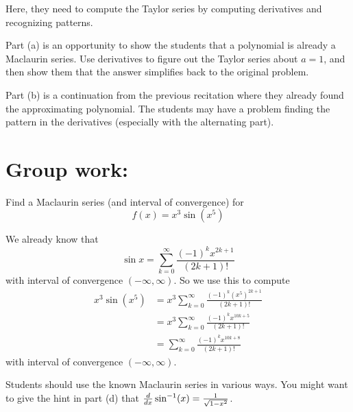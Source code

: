 \documentclass[handout]{ximera}
\begin{document}
\begin{instructorNotes}
Here, they need to compute the Taylor series by computing derivatives and recognizing patterns.  

Part (a) is an opportunity to show the students that a polynomial is already a Maclaurin series.  
Use derivatives to figure out the Taylor series about $a=1$, and then show them that the answer simplifies back to the original problem.  

Part (b) is a continuation from the previous recitation where they already found the approximating polynomial.  
The students may have a problem finding the pattern in the derivatives (especially with the alternating part).
\end{instructorNotes}







\section{Group work:}




\begin{problem}
Find a Maclaurin series (and interval of convergence) for
\[
f(x) = x^3 \sin(x^5)
\]
	
	\begin{freeResponse}
	
  We already know that 
		\[
		\sin x = \sum_{k=0}^\infty \frac{(-1)^k x^{2k+1}}{(2k+1)!}
		\]
	with interval of convergence $( - \infty, \infty)$.  
	So we use this to compute
		\begin{align*}
		x^3 \sin(x^5) &= x^3 \sum_{k=0}^\infty \frac{(-1)^k (x^5)^{2k+1}}{(2k+1)!}  \\
		&= x^3 \sum_{k=0}^\infty \frac{(-1)^k x^{10k+5}}{(2k+1)!}  \\
		&= \boxed{\sum_{k=0}^\infty \frac{(-1)^k x^{10k+8}}{(2k+1)!}}
		\end{align*}
	with interval of convergence $( - \infty, \infty)$.  
	
	

	\end{freeResponse}
	
\end{problem}

\begin{instructorNotes}
Students should use the known Maclaurin series in various ways.  
You might want to give the hint in part (d) that $\frac{d}{dx} \sin^{-1}(x) = \frac{1}{\sqrt{1-x^2}}$.  
\end{instructorNotes}
\end{document}
